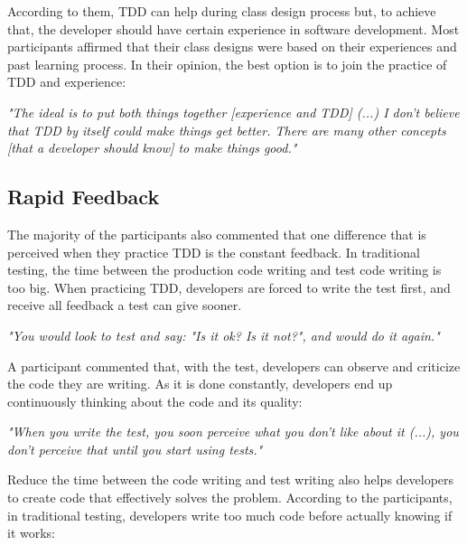 \documentclass[times]{speauth}
\begin{document}
According to them, TDD can help during class design process but, to achieve that,
the developer should have certain experience in software development. Most participants
affirmed that their class designs were based on their experiences and past learning process.
In their opinion, the best option is to join the practice of TDD and experience:

\begin{framed}

	\textit{"The ideal is to put both things together [experience and TDD] (...) 
	I don't believe that TDD by itself could make things get better. There are many other
	concepts [that a developer should know] to make things good."}

\end{framed}

\subsection{Rapid Feedback}

The majority of the participants also commented that one difference that is
perceived when they practice TDD is the constant feedback. In traditional testing,
the time between the production code writing and test code writing is too big.
When practicing TDD, developers are forced to write the test first, and receive all
feedback a test can give sooner.

\begin{framed}
	\textit{"You would look to test and say: "Is it ok? Is it not?", and would do it again."}
\end{framed}

A participant commented that, with the test, developers can observe
and criticize the code they are writing. As it is done constantly,
developers end up continuously thinking about the code and its
quality:

\begin{framed}
	\textit{"When you write the test, you soon perceive what you don't like about it (...), 
	you don't perceive that until you start using tests."}
\end{framed}

Reduce the time between the code writing and test writing also helps developers to
create code that effectively solves the problem. According to the participants, in traditional
testing, developers write too much code before actually knowing if it works:
\end{document}

